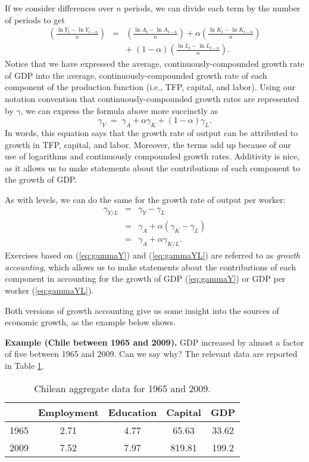 If we consider differences over $n$ periods, we can divide each term by the number of periods to get
\begin{eqnarray*}
    \left( \frac{ \ln Y_{t} - \ln Y_{t-n} }{n} \right) &=&
                    \left( \frac{\ln A_{t} - \ln A_{t-n}} {n} \right)
                    + \alpha \left( \frac{ \ln K_{t} - \ln K_{t-n}} {n} \right) \\
        && + \; (1-\alpha) \left( \frac{\ln L_{t} - \ln L_{t-n}} {n} \right).
\end{eqnarray*}
Notice that we have expressed the average, continuously-compounded growth rate of GDP into the average, continuously-compounded growth rate of each component of the production function (i.e., TFP, capital, and labor). Using our notation convention that continuously-compounded growth rates are represented by $\gamma$,
we can express the formula above more succinctly as
\begin{equation}
    \gamma_Y \;=\; \gamma_A + \alpha \gamma_K + (1-\alpha) \gamma_L.
    \label{eq:gammaY}
\end{equation}
In words, this equation says that the growth rate of output can be attributed to growth in TFP, capital, and labor. Moreover, the terms add up because of our use of logarithms and continuously compounded growth rates. Additivity is nice, as it allows us to make statements about the contributions of each component to the growth of GDP.

As with levels, we can do the same for the growth rate of output per worker:
\begin{eqnarray}
    \gamma_{Y/L} &=& \gamma_Y - \gamma_L \nonumber \\
            &=&  \gamma_A + \alpha (\gamma_K - \gamma_L) \nonumber \\
        &=& \gamma_A + \alpha \gamma_{K/L} .
    \label{eq:gammaYL}
\end{eqnarray}
Exercises based on (\ref{eq:gammaY}) and (\ref{eq:gammaYL}) are referred to as
{\it growth accounting\/}, which allows us to make statements about the contributions of each component in accounting for the growth of GDP (\ref{eq:gammaY}) or GDP per worker (\ref{eq:gammaYL}).

Both versions of growth accounting give us some insight into the sources of economic
growth, as the example below shows.


\textbf{Example (Chile between 1965 and 2009).}
GDP increased by almost a factor of five between 1965 and 2009.
Can we say why? The relevant data are reported in Table \ref{tab:chile}.
\begin{table}[h]
\centering
\caption{Chilean aggregate data for 1965 and 2009.}
\begin{tabular}{lcccc}
\toprule
                &   Employment   & Education & Capital  & GDP \\%
\midrule
1965            &     2.71    &    4.77   & 65.63  &  33.62 \\%
2009            &     7.52    &    7.97   & 819.81 & 199.2 \\%
\bottomrule
\end{tabular}
\label{tab:chile}
\end{table}

